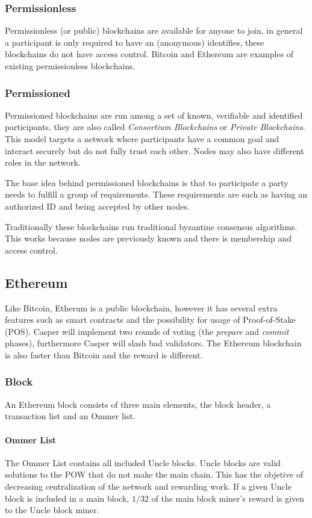 \subsubsection{Permissionless}
Permissionless (or public) blockchains are available for anyone to join,
in general a participant is only required to have an (anonymous) identifies,
these blockchains do not have access control.
Bitcoin and Ethereum are examples of existing permissionless blockchains.

\subsubsection{Permissioned}
Permissioned blockchains are run among a set of known, verifiable and identified participants,
they are also called \textit{Consortium Blockchains} or \textit{Private Blockchains}.
This model targets a network where participants have a common goal and interact securely but do not fully trust each other.
Nodes may also have different roles in the network.

The base idea behind permissioned blockchains is that to participate a party needs to fulfill a group of requirements.
These requirements are such as having an authorized ID and being accepted by other nodes.

Traditionally these blockchains run traditional byzantine consensus algorithms.
This works because nodes are previously known and there is membership and access control.

\subsection{Ethereum}

Like Bitcoin, Etherum is a public blockchain,
however it has several extra features such as smart contracts and the possibility for usage of Proof-of-Stake (POS).
Casper will implement two rounds of voting (the \textit{prepare} and \textit{commit} phases),
furthermore Casper will slash bad validators.
The Ethereum blockchain is also faster than Bitcoin and the reward is different.

\subsubsection{Block}
An Ethereum block consists of three main elements,
the block header, a transaction list and an Ommer list.

\paragraph{Ommer List}
The Ommer List contains all included Uncle blocks.
Uncle blocks are valid solutions to the POW that do not make the main chain.
This has the objetive of decreasing centralization of the network and rewarding work.
If a given Uncle block is included in a main block,
$1/32$ of the main block miner's reward is given to the Uncle block miner.

